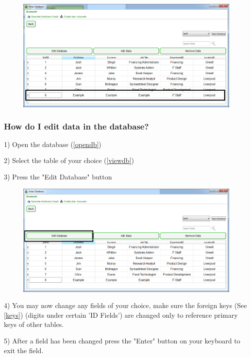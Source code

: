 \begin{figure}[H]
    \includegraphics[width=\textwidth]{./Manual/Images/adddata4.png}
\end{figure}

\subsubsection{How do I edit data in the database?}

1) Open the database (\ref{opendb})

2) Select the table of your choice (\ref{viewdb})

3) Press the "Edit Database" button 

\begin{figure}[H]
    \includegraphics[width=\textwidth]{./Manual/Images/editdata.png}
\end{figure}

4) You may now change any fields of your choice, make sure the foreign keys (See \ref{keys}) (digits under certain 'ID Fields') are changed only to reference primary keys of other tables.

5) After a field has been changed press the "Enter" button on your keyboard to exit the field.

